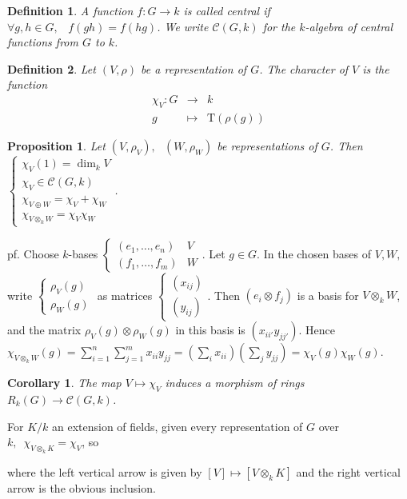 \documentclass[12pt,letterpaper]{report}
\newtheorem{definition}{Definition}[section]
\newtheorem{proposition}{Proposition}[section]
\newtheorem{corollary}{Corollary}[section]
\begin{document}
\begin{definition}A function $f:G\rightarrow k$ is called central if $\forall g,h\in G,\,\,\,\,\,f(gh)=f(hg)$. We write $\mathcal{C}(G,k)$ for the $k$-algebra of central functions from $G$ to $k$.\end{definition}
\begin{definition}Let $(V,\rho)$ be a representation of $G$. The character of $V$ is the function \begin{equation*}\begin{array}{rrr}\chi_{V}:G&\rightarrow&k\\g&\mapsto&\text{T}(\rho(g))\end{array}\end{equation*}\end{definition}

\begin{proposition}Let $(V,\rho_{V}),\,\,\,\,(W,\rho_{W})$ be representations of $G$. Then $\left\{\begin{array}{r}\chi_{V}(1)=\dim_{k}V\\\chi_{V}\in\mathcal{C}(G,k)\\\chi_{V\oplus W}=\chi_{V}+\chi_{W}\\\chi_{V\otimes_{k}W}=\chi_{V}\chi_{W}\end{array}\right.$.\end{proposition}
pf. Choose $k$-bases $\left\{\begin{array}{rr}(e_{1},\dots,e_{n})&V\\(f_{1},\dots,f_{m})&W\end{array}\right.$. Let $g\in G$. In the chosen bases of $V,W,$ write $\left\{\begin{array}{r}\rho_{V}(g)\\\rho_{W}(g)\end{array}\right.$ as matrices $\left\{\begin{array}{r}(x_{ij})\\(y_{ij})\end{array}\right.$. Then $(e_{i}\otimes f_{j})$ is a basis for $V\otimes_{k}W$, and the matrix $\rho_{V}(g)\otimes \rho_{W}(g)$ in this basis is $(x_{ii'}y_{jj'})$. Hence $\chi_{V\otimes_{k}W}(g)=\sum_{i=1}^{n}\sum_{j=1}^{m}x_{ii}y_{jj}=(\sum_{i}x_{ii})(\sum_{j}y_{jj})=\chi_{V}(g)\chi_{W}(g)$.
\begin{corollary}The map $V\mapsto\chi_{V}$ induces a morphism of rings $R_{k}(G)\rightarrow\mathcal{C}(G,k)$.\end{corollary}
For $K/k$ an extension of fields, given every representation of $G$ over $k,\,\,\,\chi_{V\otimes_{k}K}=\chi_{V}$, so  where the left vertical arrow is given by $[V]\mapsto[V\otimes_{k}K]$ and the right vertical arrow is the obvious inclusion. 
\end{document}
